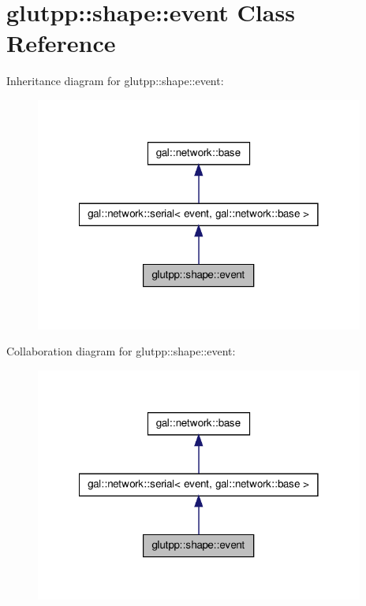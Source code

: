 \hypertarget{classglutpp_1_1shape_1_1event}{\section{glutpp\-:\-:shape\-:\-:event \-Class \-Reference}
\label{classglutpp_1_1shape_1_1event}
}


\-Inheritance diagram for glutpp\-:\-:shape\-:\-:event\-:
\nopagebreak
\begin{figure}[H]
\begin{center}
\leavevmode
\includegraphics[width=306pt]{classglutpp_1_1shape_1_1event__inherit__graph}
\end{center}
\end{figure}


\-Collaboration diagram for glutpp\-:\-:shape\-:\-:event\-:
\nopagebreak
\begin{figure}[H]
\begin{center}
\leavevmode
\includegraphics[width=306pt]{classglutpp_1_1shape_1_1event__coll__graph}
\end{center}
\end{figure}
